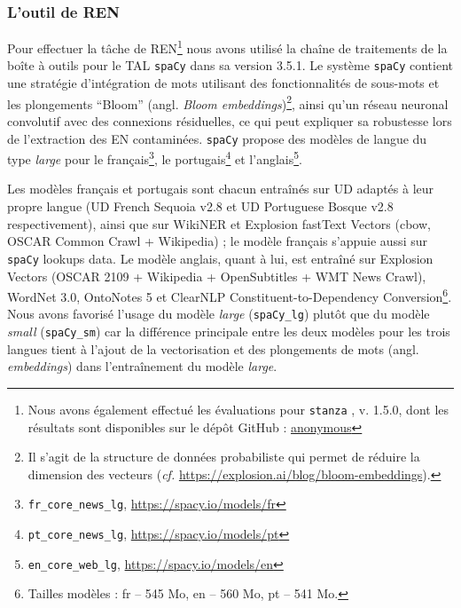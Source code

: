 \subsubsection{L'outil de REN}
Pour effectuer la tâche de REN\footnote{Nous avons également effectué les évaluations pour \texttt{stanza} \cite{qi2020stanza}, v. 1.5.0, dont les résultats sont disponibles sur le dépôt GitHub : \url{anonymous}} nous avons utilisé la chaîne de traitements de la boîte à outils pour le TAL \texttt{spaCy} dans sa version 3.5.1. %
Le système \texttt{spaCy} contient une stratégie d'intégration de mots utilisant des fonctionnalités de sous-mots et les plongements ``Bloom'' (angl. \textit{Bloom embeddings})\footnote{Il s'agit de la structure de données probabiliste qui permet de réduire la dimension des vecteurs (\textit{cf.} \url{https://explosion.ai/blog/bloom-embeddings}).}, ainsi qu'un réseau neuronal convolutif avec des connexions résiduelles, ce qui peut expliquer sa robustesse lors de l'extraction des EN contaminées. \texttt{spaCy} propose des modèles de langue du type \textit{large} pour le français\footnote{\texttt{fr\_core\_news\_lg}, \url{https://spacy.io/models/fr}}, le portugais\footnote{\texttt{pt\_core\_news\_lg}, \url{https://spacy.io/models/pt}} et l'anglais\footnote{\texttt{en\_core\_web\_lg}, \url{https://spacy.io/models/en}}. 

Les modèles français et portugais sont chacun entraînés sur UD adaptés à leur propre langue (UD French Sequoia v2.8 et UD Portuguese Bosque v2.8 respectivement), ainsi que sur WikiNER et Explosion fastText Vectors (cbow, OSCAR Common Crawl + Wikipedia) ; le modèle français s'appuie aussi sur \texttt{spaCy} lookups data. Le modèle anglais, quant à lui, est entraîné sur Explosion Vectors (OSCAR 2109 + Wikipedia + OpenSubtitles + WMT News Crawl), WordNet 3.0, OntoNotes 5 et ClearNLP Constituent-to-Dependency Conversion\footnote{Tailles modèles : fr -- 545 Mo, en -- 560 Mo, pt -- 541 Mo.}. Nous avons favorisé l'usage du modèle \textit{large} (\texttt{spaCy\_lg}) plutôt que du modèle \textit{small} (\texttt{spaCy\_sm}) car la différence principale entre les deux modèles pour les trois langues tient à l'ajout de la vectorisation et des plongements de mots (angl. \textit{embeddings}) dans l'entraînement du modèle \textit{large}.



